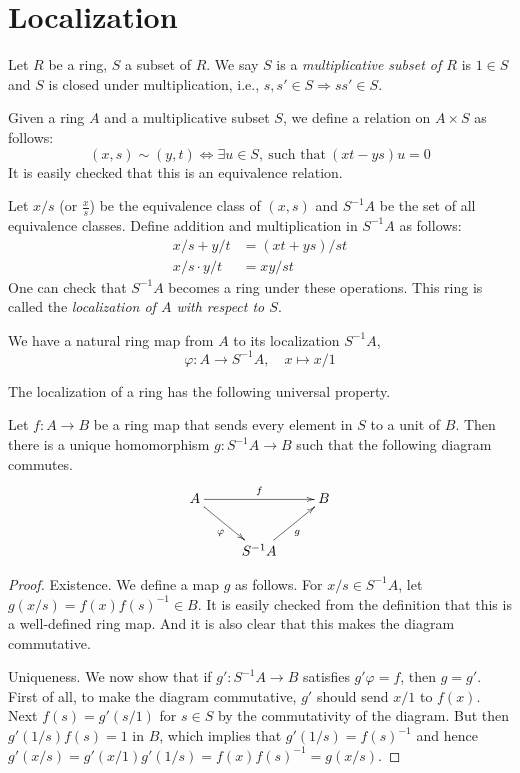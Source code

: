 \section{Localization}
\label{section-localization}

\begin{definition}
\label{definition-multiplicative-subset}
Let $R$ be a ring, $S$ a subset of $R$.
We say $S$ is a {\it multiplicative subset of $R$} is
$1\in S$ and $S$ is closed
under multiplication, i.e., $s,s' \in S \Rightarrow ss' \in S$.
\end{definition}

\noindent
Given a ring $A$ and a multiplicative subset $S$, we
define a relation on $A\times S$ as follows:
\[
(x,s)\sim(y,t) \iff \exists u\in S,\ \text{such that}\ (xt-ys)u=0
\]
It is easily checked that this is an equivalence relation.

\begin{definition}
\label{definition-localization}
Let $x/s$ (or $\frac{x}{s}$) be the equivalence class of $(x,s)$ and
$S^{-1}A$ be the set of all equivalence classes. Define addition
and multiplication in $S^{-1}A$ as follows:
\begin{align}
x/s+y/t&=(xt+ys)/st\\
x/s\cdot y/t&=xy/st
\end{align}
One can check that $S^{-1}A$ becomes a ring under these operations.
This ring is called the {\it localization of $A$ with respect to $S$}.
\end{definition}

\noindent
We have a natural ring map from $A$ to its localization $S^{-1}A$,
\[
\varphi:A\rightarrow S^{-1}A,\quad x\mapsto x/1
\]

\medskip\noindent
The localization of a ring has the following universal property.

\begin{proposition}
\label{proposition-universal-property-localization}
Let $f:A\rightarrow B$ be a ring map that sends every element in $S$ to a unit
of $B$. Then there is a unique homomorphism $g:S^{-1}A\rightarrow B$ such
that the following diagram commutes.
\[
\xymatrix{
    A \ar[rr]^{f} \ar[dr]_{\varphi} & &B\\
    &S^{-1}A \ar[ur]_{g}
    }
\]
\end{proposition}

\begin{proof}
Existence. We define a map $g$ as follows. For $x/s\in
S^{-1}A$, let $g(x/s)=f(x)f(s)^{-1}\in B$. It is easily checked from
the definition that this is a well-defined ring map. And it is also clear that 
this makes the diagram commutative.

\medskip\noindent
Uniqueness. We now show that if $g':S^{-1}A \rightarrow B$
satisfies $g'\varphi=f$, then $g=g'$. First of all, to make
the diagram commutative, $g'$ should send
$x/1$ to $f(x)$. Next $f(s)=g'(s/1)$ for $s\in S$ by the
commutativity of the diagram. But then $g'(1/s)f(s)=1$ in $B$,
which implies that $g'(1/s)=f(s)^{-1}$ and hence
$g'(x/s)=g'(x/1)g'(1/s)=f(x)f(s)^{-1}=g(x/s)$.
\end{proof}

